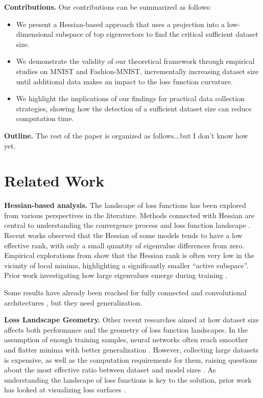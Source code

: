 \documentclass{article}
\begin{document}
\textbf{Contributions.} Our contributions can be summarized as follows:
\begin{itemize}
  \item We present a Hessian-based approach that uses a projection into a low-dimensional subspace of top eigenvectors to
        find the critical sufficient dataset size.
  \item We demonstrate the validity of our theoretical framework through empirical studies on MNIST and Fashion-MNIST,
        incrementally increasing dataset size until additional data makes an impact to the loss function curvature.
  \item We highlight the implications of our findings for practical data collection strategies, showing how the detection of
        a sufficient dataset size can reduce computation time.
\end{itemize}

\textbf{Outline.} The rest of the paper is organized as follows...but I don't know how yet.

\section{Related Work}\label{sec:rw}

\textbf{Hessian-based analysis.}
The landscape of loss functions has been explored from various perspectives in the literature. Methods connected with Hessian
are central to understanding the convergence process and loss function landscape \cite{kiselev2024unraveling}. Recent works
observed that the Hessian of some models tends to have a low effective rank, with only a small quantity of eigenvalue
differences from zero. Empirical explorations from \cite{sagun2018empirical} show that the Hessian rank is often very low in
the vicinity of local minima, highlighting a significantly smaller “active subspace”.
Prior work investigating how large eigenvalues emerge during training \cite{ghorbani2019investigation}.

Some results have already been reached for fully connected and convolutional architectures \cite{meshkov2024convnets},
but they need generalization.


\textbf{Loss Landscape Geometry.}
Other recent researches aimed at how dataset size affects both performance and the geometry of loss function landscapes.
In the assumption of enough training samples, neural networks often reach smoother and flatter minima with better
generalization \cite{wu2017towards}. However, collecting large datasets is expensive, as well as the computation
requirements for them, raising questions about the most effective ratio between dataset and model sizes
\cite{hoffmann2022training}. As understanding the landscape of loss functions is key to the solution, prior work has looked
at visualizing loss surfaces \cite{li2018visualizing}.
\end{document}
